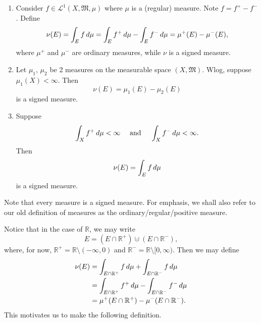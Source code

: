 \documentclass[notoc,notitlepage]{tufte-book}
\begin{document}
\begin{eg}
  \begin{enumerate}
    \item Consider $f \in \mathcal{L}^1(X, \mathfrak{M}, \mu)$ where
      $\mu$ is a (regular) measure. Note $f = f^+ - f^-$.
      Define
      \begin{equation*}
        \nu(E) = \int_E f \mathop{}\!d{\mu} = \int_E f^+ \mathop{}\!d{\mu} - \int_E f^- \mathop{}\!d{\mu}
             = \mu^+(E) - \mu^-(E),
      \end{equation*}
      where $\mu^+$ and $\mu^-$ are ordinary measures,
      while $\nu$ is a signed measure.

    \item Let $\mu_1,\, \mu_2$ be 2 measures on the measurable space
      $(X, \mathfrak{M})$.
      Wlog, suppose $\mu_1(X) < \infty$.
      Then
      \begin{equation*}
        \nu(E) = \mu_1(E) - \mu_2(E)
      \end{equation*}
      is a signed measure.

    \item Suppose
      \begin{equation*}
        \int_{X} f^+ \mathop{}\!d{\mu} < \infty \quad\text{ and }\quad
        \int_{X} f^- \mathop{}\!d{\mu} < \infty.
      \end{equation*}
      Then
      \begin{equation*}
        \nu(E) = \int_{E} f \mathop{}\!d{\mu}
      \end{equation*}
      is a signed measure.
  \end{enumerate}
\end{eg}

\begin{note}
  Note that every measure is a signed measure.
  For emphasis, we shall also refer to our old definition of measures
  as the ordinary/regular/positive measure.
\end{note}

Notice that in the case of $\mathbb{R}$, we may write
\begin{equation*}
  E = (E \cap \mathbb{R}^+) \cupdot (E \cap \mathbb{R}^-),
\end{equation*}
where, for now, $\mathbb{R}^+ = \mathbb{R} \setminus (-\infty, 0)$
and $\mathbb{R}^- = \mathbb{R} \setminus [0, \infty)$.
Then we may define
\begin{align*}
  \nu(E)
  &= \int_{E \cap \mathbb{R}^+} f \mathop{}\!d{\mu}
    + \int_{E \cap \mathbb{R}^-} f \mathop{}\!d{\mu} \\
  &= \int_{E \cap \mathbb{R}^+} f^+ \mathop{}\!d{\mu}
    - \int_{E \cap \mathbb{R}^-} f^- \mathop{}\!d{\mu} \\
  &= \mu^+(E \cap \mathbb{R}^+) - \mu^-(E \cap \mathbb{R}^-).
\end{align*}
This motivates us to make the following definition.
\end{document}
